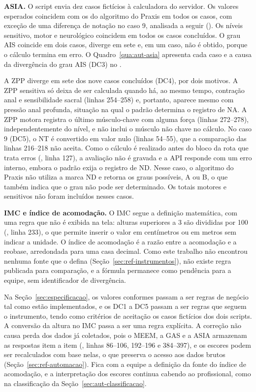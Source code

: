 \textbf{ASIA.} O script  envia dez casos fictícios à calculadora do servidor. Os
valores esperados coincidem com os do algoritmo do Praxis em todos os casos, com exceção de uma diferença de notação
no caso 9, analisada a seguir (). Os níveis sensitivo, motor e neurológico coincidem em todos
os casos concluídos. O grau AIS coincide em dois casos, diverge em sete e, em um caso, não é obtido, porque o
cálculo termina em erro. O Quadro~\ref{qua:aut-asia} apresenta cada caso e a causa da divergência do grau AIS (DC3)
no .

A ZPP diverge em sete dos nove casos concluídos (DC4), por dois motivos. A ZPP sensitiva só deixa de ser calculada
quando há, ao mesmo tempo, contração anal e sensibilidade sacral (linhas 254--258) e, portanto, aparece mesmo com
pressão anal profunda, situação na qual o padrão determina o registro de NA. A ZPP motora registra o último
músculo-chave com alguma força (linhas 272--278), independentemente do nível, e não inclui o músculo não chave no
cálculo. No caso 9 (DC5), o NT é convertido em valor nulo (linhas 54--55), que a comparação das linhas 216--218 não
aceita. Como o cálculo é realizado antes do bloco da rota que trata erros (, linha 127), a avaliação não
é gravada e a API responde com um erro interno, embora o padrão exija o registro de ND. Nesse caso, o algoritmo do
Praxis não utiliza a marca ND e retorna os graus possíveis, A ou B, o que também indica que o grau não pode ser
determinado. Os totais motores e sensitivos não foram incluídos nesses casos.

\textbf{IMC e índice de acomodação.} O IMC segue a definição matemática, com uma regra que não é exibida na tela:
alturas superiores a 3 são divididas por 100 (, linha 233), o que permite inserir o valor em
centímetros ou em metros sem indicar a unidade. O índice de acomodação é a razão entre a acomodação e a reobase,
arredondada para uma casa decimal. Como este trabalho não encontrou nenhuma fonte que o defina
(Seção~\ref{sec:ref-instrumentos}), não existe regra publicada para comparação, e a fórmula permanece como pendência
para a equipe, sem identificador de divergência.

Na Seção~\ref{sec:especificacao}, os valores conformes passam a ser regras de negócio tal como estão implementados, e
os DC1 a DC5 passam a ser regras que seguem o instrumento, tendo como critérios de aceitação os casos fictícios dos
dois scripts. A conversão da altura no IMC passa a ser uma regra explícita. A correção não causa perda dos dados já
coletados, pois o MEEM, a GAS e a ASIA armazenam as respostas item a item (, linhas 86--106, 192--196 e
384--397), e os escores podem ser recalculados com base nelas, o que preserva o acesso aos dados brutos
(Seção~\ref{sec:ref-automacao}). Fica com a equipe a definição da fonte do índice de acomodação, e a interpretação
dos escores continua cabendo ao profissional, como na classificação da Seção~\ref{sec:aut-classificacao}.

